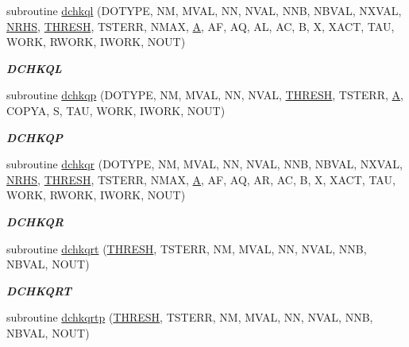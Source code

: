 \begin{DoxyCompactItemize}
subroutine \hyperlink{group__double__lin_ga701f542b4410fe36d437bba2a5cd0260}{dchkql} (D\+O\+T\+Y\+P\+E, N\+M, M\+V\+A\+L, N\+N, N\+V\+A\+L, N\+N\+B, N\+B\+V\+A\+L, N\+X\+V\+A\+L, \hyperlink{example__user_8c_aa0138da002ce2a90360df2f521eb3198}{N\+R\+H\+S}, \hyperlink{zlaqgs_8c_a0656018abfc9fa2821827415f5d5ea57}{T\+H\+R\+E\+S\+H}, T\+S\+T\+E\+R\+R, N\+M\+A\+X, \hyperlink{classA}{A}, A\+F, A\+Q, A\+L, A\+C, B, X, X\+A\+C\+T, T\+A\+U, W\+O\+R\+K, R\+W\+O\+R\+K, I\+W\+O\+R\+K, N\+O\+U\+T)
\begin{DoxyCompactList}\small\item\em {\bfseries D\+C\+H\+K\+Q\+L} \end{DoxyCompactList}\item 
subroutine \hyperlink{group__double__lin_ga27e0491d8e844b63040912da42cc732f}{dchkqp} (D\+O\+T\+Y\+P\+E, N\+M, M\+V\+A\+L, N\+N, N\+V\+A\+L, \hyperlink{zlaqgs_8c_a0656018abfc9fa2821827415f5d5ea57}{T\+H\+R\+E\+S\+H}, T\+S\+T\+E\+R\+R, \hyperlink{classA}{A}, C\+O\+P\+Y\+A, S, T\+A\+U, W\+O\+R\+K, I\+W\+O\+R\+K, N\+O\+U\+T)
\begin{DoxyCompactList}\small\item\em {\bfseries D\+C\+H\+K\+Q\+P} \end{DoxyCompactList}\item 
subroutine \hyperlink{group__double__lin_gaad041f40286cef1d3039264f464f02bc}{dchkqr} (D\+O\+T\+Y\+P\+E, N\+M, M\+V\+A\+L, N\+N, N\+V\+A\+L, N\+N\+B, N\+B\+V\+A\+L, N\+X\+V\+A\+L, \hyperlink{example__user_8c_aa0138da002ce2a90360df2f521eb3198}{N\+R\+H\+S}, \hyperlink{zlaqgs_8c_a0656018abfc9fa2821827415f5d5ea57}{T\+H\+R\+E\+S\+H}, T\+S\+T\+E\+R\+R, N\+M\+A\+X, \hyperlink{classA}{A}, A\+F, A\+Q, A\+R, A\+C, B, X, X\+A\+C\+T, T\+A\+U, W\+O\+R\+K, R\+W\+O\+R\+K, I\+W\+O\+R\+K, N\+O\+U\+T)
\begin{DoxyCompactList}\small\item\em {\bfseries D\+C\+H\+K\+Q\+R} \end{DoxyCompactList}\item 
subroutine \hyperlink{group__double__lin_ga3b4ab9461495d638095380868fa97049}{dchkqrt} (\hyperlink{zlaqgs_8c_a0656018abfc9fa2821827415f5d5ea57}{T\+H\+R\+E\+S\+H}, T\+S\+T\+E\+R\+R, N\+M, M\+V\+A\+L, N\+N, N\+V\+A\+L, N\+N\+B, N\+B\+V\+A\+L, N\+O\+U\+T)
\begin{DoxyCompactList}\small\item\em {\bfseries D\+C\+H\+K\+Q\+R\+T} \end{DoxyCompactList}\item 
subroutine \hyperlink{group__double__lin_gae0e141a4d9e70990a118f31558c06079}{dchkqrtp} (\hyperlink{zlaqgs_8c_a0656018abfc9fa2821827415f5d5ea57}{T\+H\+R\+E\+S\+H}, T\+S\+T\+E\+R\+R, N\+M, M\+V\+A\+L, N\+N, N\+V\+A\+L, N\+N\+B, N\+B\+V\+A\+L, N\+O\+U\+T)

\end{DoxyCompactItemize}
